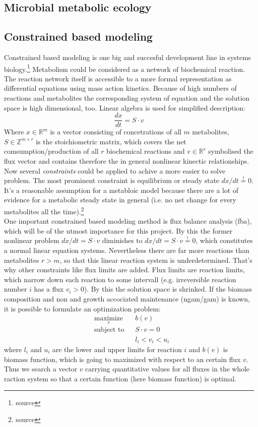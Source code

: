 \subsection{Microbial metabolic ecology}

\subsection{Constrained based modeling}
Constrained based modeling is one big and succesful development line in systems biology.\footnote{source}
Metabolism could be considered as a network of biochemical reaction.
The reaction network itself is accessible to a more formal representation as differential equations using mass action kinetics.
Because of high numbers of reactions and metabolites the corresponding system of equation and the solution space is high dimensional, too.
Linear algebra is used for simplified description:
\[
  \frac{dx}{dt}=S \cdot v
\]
Where $x\in \mathbb{R}^m$ is a vector consisting of concetrations of all $m$ metabolites, $S\in \mathbb{Z}^{m\times r}$ is the stoichiometric matrix, which covers the net comsumption/production of all $r$ biochemical reactions and $v \in \mathbb{R}^r$ symbolised the flux vector and contains therefore the in general nonlinear kinectic relationships.\\
Now several \textit{constraints} could be applied to achive a more easier to solve problem.
The most prominent constraint is equilibrium or steady state $dx/dt \stackrel{!}{=}0$.
It's a reasonable assumption for a metabloic model because there are a lot of evidence for a metabolic steady state in general (i.e. no net change for every metabolites all the time).\footnote{source}\\
One important constrained based modeling method is flux balance analysis (fba), which will be of the utmost importance for this project.
By this the former nonlinear problem $dx/dt=S\cdot v$ diminishes to $dx/dt=S\cdot v \stackrel{!}{=}0$, which constitutes a normal linear equation systems.
Nevertheless there are far more reactions than metabolites $r>m$, so that this linear reaction system is underdetermined.
That's why other constraints like flux limits are added.
Flux limits are reaction limits, which narrow down each reaction to some intervall (e.g. irreversible reaction number $i$ has a flux $v_i>0$).
By this the solution space is shrinked.
If the biomass composition and non and growth accociated maintenance (ngam/gam) is known, it is possible to formulate an optimization problem:
\begin{equation*}
  \begin{aligned}
    & \underset{v}{\text{maximize}} & & b(v) \\
    & \text{subject to} & & S \cdot v = 0 \\
    & & & l_i < v_i < u_i
  \end{aligned}
\end{equation*}
where $l_i$ and $u_i$ are the lower and upper limits for reaction $i$ and $b(v)$ is biomass function, which is going to maximized with respect to an certain flux $v$.
Thus we search a vector $v$ carrying quantitative values for all fluxes in the whole raction system so that a certain function (here biomass function) is optimal.


